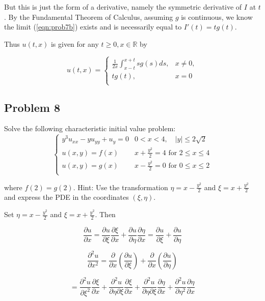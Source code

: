 \documentclass[
]{article}
\begin{document}
But this is just the form of a derivative, namely the symmetric
derivative of \(I\) at \(t\). By the Fundamental Theorem of Calculus,
assuming \(g\) is continuous, we know the limit (\ref{eqn:prob7b})
exists and is necessarily equal to \(I'(t)=tg(t)\).

Thus \(u(t,x)\) is given for any \(t \geq 0, x \in \mathbb{R}\) by

\begin{equation} \label{eqn:prob7c} 
u(t,x)=
\begin{cases}
      \frac{1}{2x} \int_{x-t}^{x+t}{sg(s)ds,} & x \neq 0, \\
      tg(t), & x=0 \\
    \end{cases} 
\end{equation}

\hypertarget{problem-8}{%
\subsection{Problem 8}\label{problem-8}}

Solve the following characteristic initial value problem:
\begin{equation} 
\begin{cases}
  y^3u_{xx}-yu_{yy}+u_y=0 & 0<x<4, \quad \lvert y \rvert \leq 2 \sqrt{2} \\
  u(x,y)= f(x) & x+ \frac{y^2}{2}=4 \text{ for } 2 \leq x \leq 4 \\
  u(x,y)=g(x) & x- \frac{y^2}{2}=0 \text{ for } 0 \leq x \leq 2 \\
\end{cases}
\end{equation}

where \(f(2)=g(2)\). Hint: Use the transformation
\(\eta=x-\frac{y^2}{2}\) and \(\xi=x+\frac{y^2}{2}\) and express the PDE
in the coordinates \((\xi, \eta)\).

Set \(\eta=x-\frac{y^2}{2}\) and \(\xi=x+\frac{y^2}{2}\). Then

\[\frac{\partial u}{\partial x} = \frac{\partial u}{\partial \xi} \frac{\partial \xi}{\partial x}+\frac{\partial u}{\partial\eta}\frac{\partial\eta}{\partial x} = \frac{\partial u}{\partial \xi}+\frac{\partial u}{\partial\eta}\]

\[\frac{\partial^2 u}{\partial x^2} = \frac{\partial }{\partial x} \left(\frac{\partial u}{\partial \xi}\right) +\frac{\partial }{\partial x} \left(\frac{\partial u}{\partial \eta}\right)\]

\[=\frac{\partial^2 u}{\partial \xi^2} \frac{\partial \xi}{\partial x}+
\frac{\partial^2 u}{\partial\eta \partial \xi}\frac{\partial \xi}{\partial x} +
\frac{\partial^2 u}{\partial\eta \partial \xi}\frac{\partial\eta}{\partial x}+
\frac{\partial^2 u}{\partial \eta^2}\frac{\partial \eta}{\partial x}  \]
\end{document}
